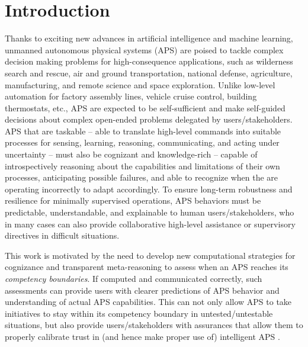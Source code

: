 \section{Introduction}

Thanks to exciting new advances in artificial intelligence and machine learning, unmanned autonomous physical systems (APS) are poised to tackle complex decision making problems for high-consequence applications, such as wilderness search and rescue, air and ground transportation, national defense, agriculture, manufacturing, and remote science and space exploration. 
Unlike low-level automation for factory assembly lines, vehicle cruise control, building thermostats, etc., APS are expected to be self-sufficient and make self-guided decisions about complex open-ended problems delegated by users/stakeholders. APS that are taskable -- able to translate high-level commands into suitable processes for sensing, learning, reasoning, communicating, and acting under uncertainty -- must also be cognizant and knowledge-rich -- capable of introspectively reasoning about the capabilities and limitations of their own processes, anticipating possible failures, and able to recognize when the are operating incorrectly to adapt accordingly. To ensure long-term robustness and resilience for minimally supervised operations, APS behaviors must be predictable, understandable, and explainable to human users/stakeholders, who in many cases can also provide collaborative high-level assistance or supervisory directives in difficult situations. 

This work is motivated by the need to develop new computational strategies for cognizance and transparent meta-reasoning to assess when an APS reaches its \emph{competency boundaries}. If computed and communicated correctly, such assessments can provide users with clearer predictions of APS behavior and understanding of actual APS capabilities. This can not only allow APS to take initiatives to stay within its competency boundary in untested/untestable situations, but also provide users/stakeholders with assurances that allow them to properly calibrate trust in (and hence make proper use of) intelligent APS \cite{Israelsen-ACM-2018}. 

